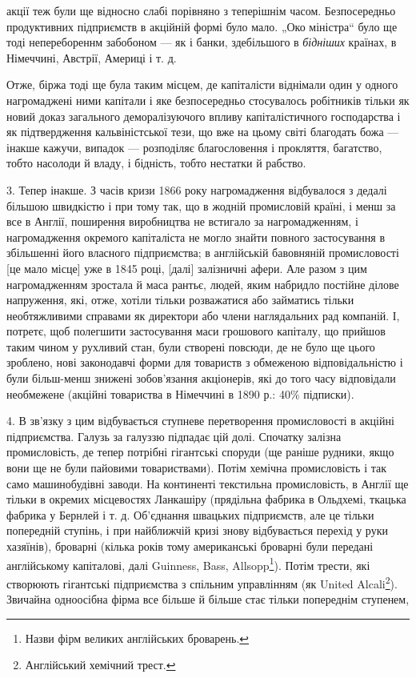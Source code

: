 \parcont{}  %
акції теж були ще відносно слабі порівняно з теперішнім часом. Безпосередньо продуктивних підприємств в акційній формі було
мало. „Око міністра“ було ще тоді неперебореннм забобоном — як і банки, здебільшого в \emph{бідніших} країнах, в Німеччині,
Австрії, Америці і т. д.

Отже, біржа тоді ще була таким місцем, де капіталісти віднімали один у одного нагромаджені ними
капітали і яке безпосередньо стосувалось робітників тільки як новий доказ загального деморалізуючого впливу капіталістичного
господарства і як підтвердження кальвіністської тези, що вже на цьому світі благодать божа — інакше кажучи, випадок —
розподіляє благословення і прокляття, багатство, тобто насолоди й владу, і бідність, тобто нестатки й рабство.

3. Тепер інакше. З часів кризи 1866 року нагромадження відбувалося з дедалі більшою швидкістю і при тому так, що в жодній промисловій
країні, і менш за все в Англії, поширення виробництва не встигало за нагромадженням, і нагромадження окремого капіталіста не
могло знайти повного застосування в збільшенні його власного підприємства; в англійській бавовняній промисловості [це мало
місце] уже в 1845 році, [далі] залізничні афери. Але разом з цим нагромадженням зростала й маса рантьє, людей, яким набридло
постійне ділове напруження, які, отже, хотіли тільки розважатися або займатись тільки необтяжливими справами як директори
або члени наглядальних рад компаній. І, потретє, щоб полегшити застосування маси грошового капіталу, що прийшов таким чином
у рухливий стан, були створені повсюди, де не було ще цього зроблено, нові законодавчі форми для товариств з обмеженою
відповідальністю і були більш-менш знижені зобов’язання акціонерів, які до того часу відповідали необмежене (акційні
товариства в Німеччині в 1890 р.: 40\% підписки).

4. В зв’язку з цим відбувається ступневе перетворення промисловості в акційні підприємства. Галузь за галуззю підпадає цій
долі. Спочатку залізна промисловість, де тепер потрібні гігантські споруди (ще раніше рудники, якщо вони ще не були пайовими
товариствами). Потім хемічна промисловість і так само машинобудівні заводи. На континенті текстильна промисловість, в Англії
ще тільки в окремих місцевостях Ланкашіру (прядільна фабрика в Ольдхемі, ткацька фабрика у Бернлей і т. д. Об’єднання
швацьких підприємств, але це тільки попередній ступінь, і при найближчій кризі знову відбувається перехід у руки хазяїнів),
броварні (кілька років тому американські броварні були передані англійському капіталові, далі Guinness, Bass,  Allsopp\footnote*{Назви фірм великих англійських броварень. }).
Потім трести, які створюють гігантські підприємства з спільним управлінням (як United Alcali\footnote*{Англійський хемічний трест. }). Звичайна одноосібна фірма
все більше й більше стає тільки попереднім ступенем,
\parbreak{}  %
